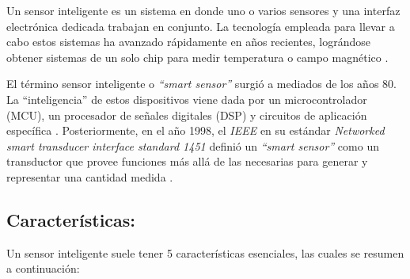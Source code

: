 Un sensor inteligente es un sistema en donde uno o varios sensores y una interfaz electrónica dedicada trabajan en conjunto. La tecnología empleada para llevar a cabo estos sistemas ha avanzado rápidamente en años recientes, lográndose obtener sistemas de un solo chip para medir temperatura o campo magnético \citep{nagayama2007structural}.


El término sensor inteligente o \textit{``smart sensor''} surgió a mediados de los años 80. La ``inteligencia'' de estos dispositivos viene dada por un microcontrolador (MCU), un procesador de señales digitales (DSP) y circuitos de aplicación específica \citep{frank2002understanding}. Posteriormente, en el año 1998, el \textit{IEEE} en su estándar \textit{Networked smart transducer interface standard 1451} definió un \textit{``smart sensor''} como un transductor que provee funciones más allá de las necesarias para generar y representar una cantidad medida \citep{song2008understanding}.

\subsection{Características:}

Un sensor inteligente suele tener 5 características esenciales, las cuales se resumen a continuación:

